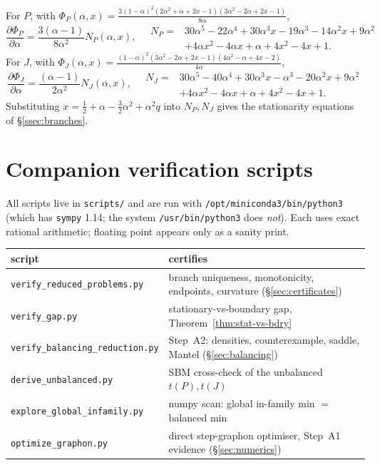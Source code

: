 \documentclass[11pt]{amsart}
\theoremstyle{definition}
\newcommand{\1}{\mathbf 1}
\begin{document}
For $P$, with
$\Phi_P(\alpha,x)=\frac{3(1-\alpha)^2(2\alpha^2+\alpha+2x-1)(3\alpha^2-2\alpha+2x-1)}{8\alpha}$,
\[
\frac{\partial \Phi_P}{\partial \alpha}
=\frac{3(\alpha-1)}{8\alpha^2}N_P(\alpha,x),
\quad
\begin{aligned}
N_P={}&30\alpha^5-22\alpha^4+30\alpha^3x-19\alpha^3
-14\alpha^2x+9\alpha^2\\
&+4\alpha x^2-4\alpha x+\alpha+4x^2-4x+1.
\end{aligned}
\]
For $J$, with
$\Phi_J(\alpha,x)=\frac{(1-\alpha)^2(3\alpha^2-2\alpha+2x-1)(4\alpha^2-\alpha+4x-2)}{4\alpha}$,
\[
\frac{\partial \Phi_J}{\partial \alpha}
=\frac{(\alpha-1)}{2\alpha^2}N_J(\alpha,x),
\quad
\begin{aligned}
N_J={}&30\alpha^5-40\alpha^4+30\alpha^3x-\alpha^3
-20\alpha^2x+9\alpha^2\\
&+4\alpha x^2-4\alpha x+\alpha+4x^2-4x+1.
\end{aligned}
\]
Substituting $x=\frac12+\alpha-\frac32\alpha^2+\alpha^2q$ into $N_P,N_J$ gives the
stationarity equations of \S\ref{ssec:branches}.

\section{Companion verification scripts}
\label{app:scripts}

All scripts live in \texttt{scripts/} and are run with
\texttt{/opt/miniconda3/bin/python3} (which has \texttt{sympy} 1.14; the system
\texttt{/usr/bin/python3} does \emph{not}).  Each uses exact rational arithmetic;
floating point appears only as a sanity print.

\begin{center}
\begin{tabular}{l|l}
script & certifies \\ \hline
\texttt{verify\_reduced\_problems.py} & branch uniqueness, monotonicity, endpoints, curvature (\S\ref{sec:certificates}) \\
\texttt{verify\_gap.py} & stationary-vs-boundary gap, Theorem~\ref{thm:stat-vs-bdry} \\
\texttt{verify\_balancing\_reduction.py} & Step~A2: densities, counterexample, saddle, Mantel (\S\ref{sec:balancing}) \\
\texttt{derive\_unbalanced.py} & SBM cross-check of the unbalanced $t(P),t(J)$ \\
\texttt{explore\_global\_infamily.py} & numpy scan: global in-family min $=$ balanced min \\
\texttt{optimize\_graphon.py} & direct step-graphon optimiser, Step~A1 evidence (\S\ref{sec:numerics}) \\
\end{tabular}
\end{center}
\end{document}
